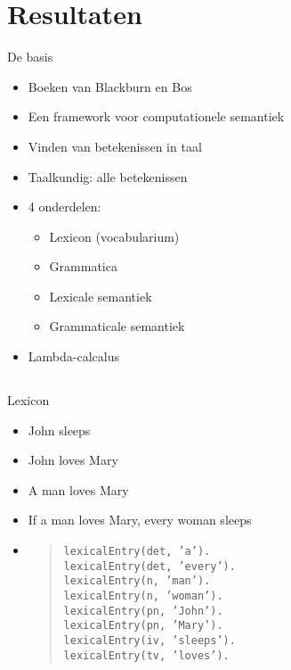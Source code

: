 \documentclass[notes, dvipsnames]{beamer}
\newcommand{\seperation}{
	\vspace{1em}
	\ppause
}
\newcommand{\hitem}{
	\ppause
	\item
}
\newcommand{\ppause}{\onslide<+>}
\begin{document}
  \section{Resultaten}
	\begin{frame}{De basis}
		\begin{itemize}
			\hitem Boeken van Blackburn en Bos \cite{BlackburnBosBook1, BlackburnBosBook2} 
      \item Een framework voor computationele semantiek
      \item Vinden van betekenissen in taal
      \item Taalkundig: alle betekenissen
			
			\seperation
      \item 4 onderdelen:
        \begin{itemize}
          \item Lexicon (vocabularium)
          \item Grammatica
          \item Lexicale semantiek
          \item Grammaticale semantiek
        \end{itemize}
      \item Lambda-calcalus
		\end{itemize}
	\end{frame}

  \subsection{}
	\begin{frame}{Lexicon}
		\begin{itemize}
      \hitem John sleeps
			\item John loves Mary
      \item A man loves Mary
      \item If a man loves Mary, every woman sleeps
      \hitem
        \begin{quote}
          \texttt{lexicalEntry(det, 'a').} \\
          \texttt{lexicalEntry(det, 'every').} \\
          \texttt{lexicalEntry(n, 'man').} \\
          \texttt{lexicalEntry(n, 'woman').} \\
          \texttt{lexicalEntry(pn, 'John').} \\
          \texttt{lexicalEntry(pn, 'Mary').} \\
          \texttt{lexicalEntry(iv, 'sleeps').} \\
          \texttt{lexicalEntry(tv, 'loves').} \\
        \end{quote}
		\end{itemize}
	\end{frame}
\end{document}

